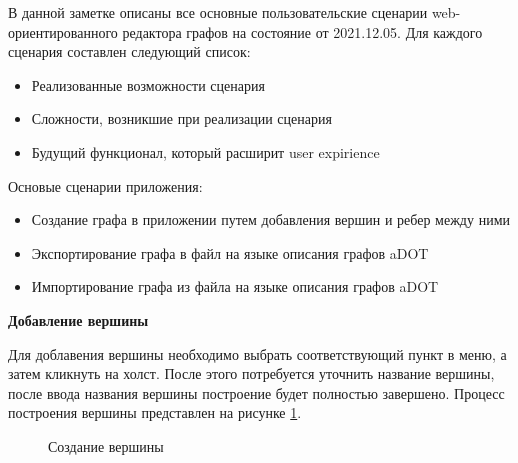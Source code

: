 \def\notedate{2021.05.12}
\def\currentauthor{Ершов В. (РК6-72Б)}

В данной заметке описаны все основные пользовательские сценарии web-ориентированного редактора графов на состояние от 2021.12.05. Для каждого сценария составлен следующий список:
\begin{itemize}
	\item Реализованные возможности сценария
	\item Сложности, возникшие при реализации сценария
	\item Будущий функционал, который расширит user expirience
\end{itemize}
Основые сценарии приложения:
\begin{itemize}
	\item Создание графа в приложении путем добавления вершин и ребер между ними
	\item Экспортирование графа в файл на языке описания графов aDOT
	\item Импортирование графа из файла на языке описания графов aDOT
\end{itemize}

\textbf{Добавление вершины}

Для доблавения вершины необходимо выбрать соответствующий пункт в меню, а затем кликнуть на холст.
После этого потребуется уточнить название вершины, после ввода названия вершины построение будет полностью завершено. Процесс построения вершины представлен на рисунке \ref{fig:vertex_create_1}.

\begin{figure}[h!]
\caption{Создание вершины}
\label{fig:vertex_create_1}
\end{figure}

